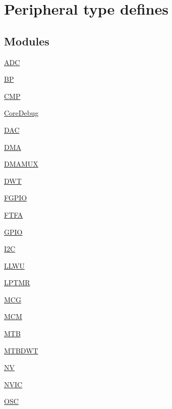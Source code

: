 \hypertarget{group___peripheral__defines}{}\section{Peripheral type defines}
\label{group___peripheral__defines}
\subsection*{Modules}
\begin{DoxyCompactItemize}
\item 
\hyperlink{group___a_d_c___peripheral}{A\+D\+C}
\item 
\hyperlink{group___b_p___peripheral}{B\+P}
\item 
\hyperlink{group___c_m_p___peripheral}{C\+M\+P}
\item 
\hyperlink{group___core_debug___peripheral}{Core\+Debug}
\item 
\hyperlink{group___d_a_c___peripheral}{D\+A\+C}
\item 
\hyperlink{group___d_m_a___peripheral}{D\+M\+A}
\item 
\hyperlink{group___d_m_a_m_u_x___peripheral}{D\+M\+A\+M\+U\+X}
\item 
\hyperlink{group___d_w_t___peripheral}{D\+W\+T}
\item 
\hyperlink{group___f_g_p_i_o___peripheral}{F\+G\+P\+I\+O}
\item 
\hyperlink{group___f_t_f_a___peripheral}{F\+T\+F\+A}
\item 
\hyperlink{group___g_p_i_o___peripheral}{G\+P\+I\+O}
\item 
\hyperlink{group___i2_c___peripheral}{I2\+C}
\item 
\hyperlink{group___l_l_w_u___peripheral}{L\+L\+W\+U}
\item 
\hyperlink{group___l_p_t_m_r___peripheral}{L\+P\+T\+M\+R}
\item 
\hyperlink{group___m_c_g___peripheral}{M\+C\+G}
\item 
\hyperlink{group___m_c_m___peripheral}{M\+C\+M}
\item 
\hyperlink{group___m_t_b___peripheral}{M\+T\+B}
\item 
\hyperlink{group___m_t_b_d_w_t___peripheral}{M\+T\+B\+D\+W\+T}
\item 
\hyperlink{group___n_v___peripheral}{N\+V}
\item 
\hyperlink{group___n_v_i_c___peripheral}{N\+V\+I\+C}
\item 
\hyperlink{group___o_s_c___peripheral}{O\+S\+C}

\end{DoxyCompactItemize}
